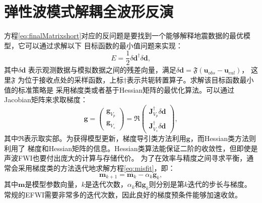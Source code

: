 \section{弹性波模式解耦全波形反演}
方程\eqref{eq:finalMatrixshort}对应的反问题是要找到一个能够解释地震数据的最优模型，它可以通过求解以下
目标函数的最小值问题来实现：
\begin{equation}
    E=\frac{1}{2}\delta\mathbf{d}^{\dagger}\delta\mathbf{d},
    \label{eq:misfit}
\end{equation}
其中$\delta\mathbf{d}$ 表示观测数据与模拟数据之间的残差向量，满足$\delta\mathbf{d}=\mathfrak{F}(\mathbf{u}_{obs}-\mathbf{u}_{cal})$，
这里$\mathfrak{F}$ 为位于接收点处的采样函数，上标$\dagger$表示共轭转置算子。求解该目标函数最小值的标准策略是
采用梯度类或者基于Hessian矩阵的最优化算法。可以通过Jacobian矩阵来求取梯度：
\begin{equation}
        \mathbf{g}=
        \begin{pmatrix}
                \mathbf{g}_{V_p}\\
                \mathbf{g}_{V_s}
        \end{pmatrix}
        =\mathfrak{R}\begin{pmatrix}
                \mathbf{J}^{\dagger}_{V_p}\delta \mathbf{d}\\
                \mathbf{J}^{\dagger}_{V_s}\delta \mathbf{d}
        \end{pmatrix},
        \label{eq:MatrixGra1}
\end{equation}
其中$\mathfrak{R}$表示取实部。为获得模型更新，梯度导引类方法利用$\mathbf{g}$，而Hessian类方法则利用了
梯度和Hessian矩阵的信息。Hessian类算法能保证二阶的收敛性，但即使是声波FWI也要付出庞大的计算与存储代价。
为了在效率与精度之间寻求平衡，通常会采用梯度类的方法迭代地求解方程\eqref{eq:misfit}，即：
\begin{equation}
        \mathbf{m}_{k+1}=\mathbf{m}_{k}-\alpha_k \mathbf{g}_k,
        \label{eq:Gradientmethod1}
\end{equation}
其中$\mathbf{m}$是模型参数向量，$k$是迭代次数，$\alpha_k$和$\mathbf{g}_k$则分别是第$k$迭代的步长与梯度。
常规的EFWI需要非常多的迭代次数，因此良好的梯度预条件能够加速收敛。


